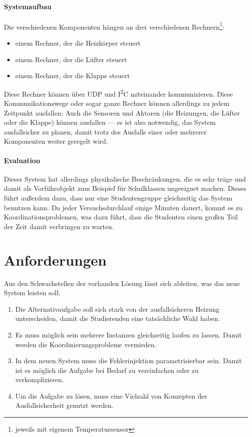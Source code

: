 \paragraph{Systemaufbau} Die verschiedenen Komponenten h{\"{a}}ngen an drei verschiedenen Rechnern\footnote{jeweils mit eigenem Temperatursensor}:
\begin{itemize}
\item einem Rechner, der die Heizk{\"{o}}rper steuert
\item einem Rechner, der die L{\"{u}}fter steuert
\item einem Rechner, der die Klappe steuert
\end{itemize}

Diese Rechner k{\"{o}}nnen {\"{u}}ber UDP und I\textsuperscript{2}C miteinander kommunizieren. Diese Kommunikationswege oder sogar ganze Rechner k{\"{o}}nnen
allerdings zu jedem Zeitpunkt ausfallen; Auch die Sensoren und Aktoren (die Heizungen, die L{\"{u}}fter oder die Klappe) k{\"{o}}nnen ausfallen --- es ist also notwendig, das
System ausfallsicher zu planen, damit trotz des Ausfalls einer oder mehrerer Komponenten weiter geregelt wird.

\paragraph{Evaluation} Dieses System hat allerdings physikalische Beschr{\"{a}}nkungen, die es sehr tr{\"{a}}ge und damit als Vorf{\"{u}}hrobjekt zum Beispiel f{\"{u}}r Schulklassen
ungeeignet machen. Dieses f{\"{u}}hrt au{\ss}erdem dazu, dass nur eine Studentengruppe gleichzeitig das System benutzen kann. Da jeder Versuchsdurchlauf einige Minuten dauert, kommt es zu
Koordinationsproblemen, was dazu f{\"{u}}hrt, dass die Studenten einen gro{\ss}en Teil der Zeit damit verbringen zu warten.

\clearpage
\section{Anforderungen}
Aus den Schwachstellen der vorhanden L{\"{o}}sung l{\"{a}}sst sich ableiten, was das neue System leisten soll:
\begin{enumerate}
	\item Die Alternativaufgabe soll sich stark von der ausfallsicheren Heizung unterscheiden, damit die Studierenden eine tats{\"{a}}chliche Wahl haben.
	\item Es muss m{\"{o}}glich sein mehrere Instanzen gleichzeitig laufen zu lassen. Damit werden die Koordinierungsprobleme vermieden.
	\item In dem neuen System muss die Fehlerinjektion parametrisierbar sein. Damit ist es m{\"{o}}glich die Aufgabe bei Bedarf zu vereinfachen oder
		zu verkomplizieren.
	\item Um die Aufgabe zu l{\"{o}}sen, muss eine Vielzahl von Konzepten der Ausfallsicherheit genutzt werden.
\end{enumerate}

